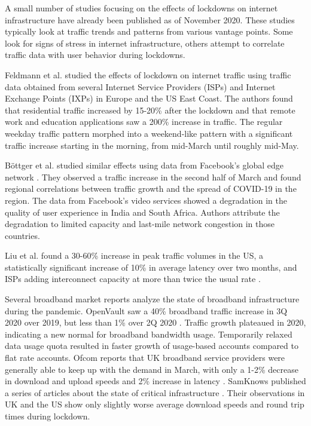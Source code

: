 \documentclass[conference,10pt]{IEEEtran}
\begin{document}

A small number of studies focusing on the effects of lockdowns on internet infrastructure have already been published as of November 2020. These studies typically look at traffic trends and patterns from various vantage points. Some look for signs of stress in internet infrastructure, others attempt to correlate traffic data with user behavior during lockdowns.

Feldmann et al. studied the effects of lockdown on internet traffic using traffic data obtained from several Internet Service Providers (ISPs) and Internet Exchange Points (IXPs) in Europe and the US East Coast\cite{feldmann2020lockdown}. The authors found that residential traffic increased by 15-20\% after the lockdown and that remote work and education applications saw a 200\% increase in traffic. The regular weekday traffic pattern morphed into a weekend-like pattern with a significant traffic increase starting in the morning, from mid-March until roughly mid-May.

B\"{o}ttger et al. studied similar effects using data from Facebook's global edge network \cite{bottger2020internet}. They observed a traffic increase in the second half of March and found regional correlations between traffic growth and the spread of COVID-19 in the region. The data from Facebook's video services showed a degradation in the quality of user experience in India and South Africa. Authors attribute the degradation to limited capacity and last-mile network congestion in those countries.

Liu et al. found a 30-60\% increase in peak traffic volumes in the US, a statistically significant increase of 10\% in average latency over two months, and ISPs adding interconnect capacity at more than twice the usual rate \cite{liu2020characterizing}.

Several broadband market reports analyze the state of broadband infrastructure during the pandemic. OpenVault saw a 40\% broadband traffic increase in 3Q 2020 over 2019, but less than 1\% over 2Q 2020 \cite{openvault}. Traffic growth plateaued in 2020, indicating a new normal for broadband bandwidth usage. Temporarily relaxed data usage quota resulted in faster growth of usage-based accounts compared to flat rate accounts. Ofcom reports that UK broadband service providers were generally able to keep up with the demand in March, with only a 1-2\% decrease in download and upload speeds and 2\% increase in latency \cite{uk-home-broadband-performance}. SamKnows published a series of articles about the state of critical infrastructure \cite{samknows-cdn,samknows-video-streaming,samknows-video-conferencing,samknows-usa}. Their observations in UK and the US show only slightly worse average download speeds and round trip times during lockdown.
\end{document}
